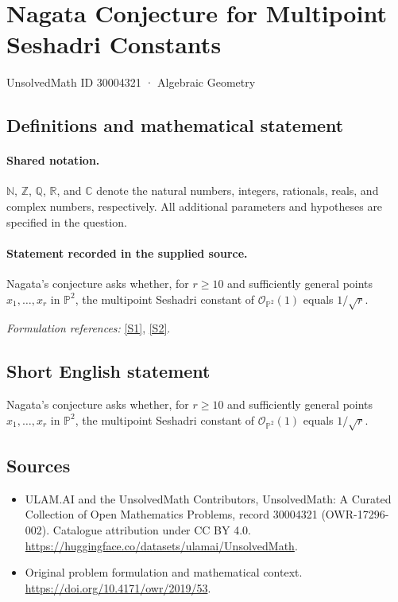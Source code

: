 \documentclass[11pt]{article}
\newcommand{\sref}[2]{\hyperlink{source:#1:#2}{[S#2]}}
\begin{document}
\setcounter{section}{30004320}
\section{Nagata Conjecture for Multipoint Seshadri Constants}\label{30004321}
{\small UnsolvedMath ID 30004321 · Algebraic Geometry}
\subsection{Definitions and mathematical statement}

\paragraph{Shared notation.}$\mathbb N$, $\mathbb Z$, $\mathbb Q$, $\mathbb R$, and $\mathbb C$ denote the natural numbers, integers, rationals, reals, and complex numbers, respectively. All additional parameters and hypotheses are specified in the question.


\paragraph{Statement recorded in the supplied source.}
Nagata's conjecture asks whether, for $r\geq 10$ and sufficiently general points $x_1,\ldots,x_r$ in $\mathbb{P}^2$, the multipoint Seshadri constant of $\mathcal{O}_{\mathbb{P}^2}(1)$ equals $1/\sqrt r$.
\par\smallskip\textit{Formulation references:} \sref{30004321}{1}, \sref{30004321}{2}.
\subsection{Short English statement}
Nagata's conjecture asks whether, for $r\geq 10$ and sufficiently general points $x_1,\ldots,x_r$ in $\mathbb{P}^2$, the multipoint Seshadri constant of $\mathcal{O}_{\mathbb{P}^2}(1)$ equals $1/\sqrt r$.
\subsection{Sources}
\begin{itemize}
\item[\hypertarget{source:30004321:1}{S1}] ULAM.AI and the UnsolvedMath Contributors, UnsolvedMath: A Curated Collection of Open Mathematics Problems, record 30004321 (OWR-17296-002). Catalogue attribution under CC BY 4.0.
\url{https://huggingface.co/datasets/ulamai/UnsolvedMath}.
\item[\hypertarget{source:30004321:2}{S2}] Original problem formulation and mathematical context.
\url{https://doi.org/10.4171/owr/2019/53}.
\end{itemize}
\label{end:30004321}
\end{document}
